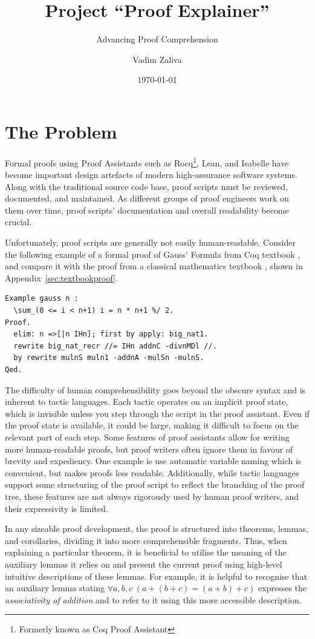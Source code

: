 \documentclass[10pt,nonacm,natbib=false]{acmart}
\title{Project ``Proof Explainer''}
\subtitle{Advancing Proof Comprehension}
\date{\today} %
\author{Vadim Zaliva}
\begin{document}
\maketitle

\section*{The Problem}

Formal proofs using Proof Assistants such as Rocq\footnote{Formerly
  known as Coq Proof Assistant}, Lean, and Isabelle have become important design
artefacts of modern high-assurance software systems. Along with the
traditional source code base, proof scripts must be reviewed,
documented, and maintained. As different groups of proof engineers
work on them over time, proof scripts' documentation and overall
readability become crucial.

Unfortunately, proof scripts are generally not easily
human-readable. Consider the following example of a formal proof of
Gauss' Formula from Coq textbook \cite{mahboubi2021mathematical}, and
compare it with the proof from a classical mathematics textbook
\cite{roberts2014introduction}, shown in Appendix~\ref{sec:textbookproof}.

\begin{lstlisting}
Example gauss n :
  \sum_(0 <= i < n+1) i = n * n+1 %/ 2.
Proof.
  elim: n =>[|n IHn]; first by apply: big_nat1.
  rewrite big_nat_recr //= IHn addnC -divnMDl //.
  by rewrite mulnS muln1 -addnA -mulSn -mulnS.
Qed.
\end{lstlisting}

The difficulty of human comprehensibility goes beyond the obscure
syntax and is inherent to tactic languages. Each tactic operates on an
implicit proof state, which is invisible unless you step through the
script in the proof assistant. Even if the proof state is available,
it could be large, making it difficult to focus on the relevant part
of each step. Some features of proof assistants allow for writing more
human-readable proofs, but proof writers often ignore them in favour
of brevity and expediency. One example is use automatic variable
naming which is convenient, but makes proofs less
readable. Additionally, while tactic languages support some
structuring of the proof script to reflect the branching of the proof
tree, these features are not always rigorously used by human proof
writers, and their expressivity is limited.

In any sizeable proof development, the proof is structured into
theorems, lemmas, and corollaries, dividing it into more
comprehensible fragments.  Thus, when explaining a particular theorem,
it is beneficial to utilise the meaning of the auxiliary lemmas it
relies on and present the current proof using high-level intuitive
descriptions of these lemmas. For example, it is helpful to recognise
that an auxiliary lemma stating
$\forall a, b, c \; (a + (b + c) = (a + b) + c)$ expresses the
\textit{associativity of addition} and to refer to it using this more
accessible description.
\end{document}
